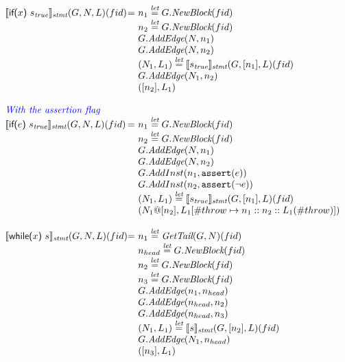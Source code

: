\[
\begin{array}{l@{}l@{~}l}

\transfun{\ircfgif{x}{s_{\emph{true}}}{}}_{\emph{stmt}}(G,N,L)(fid) & = &
	n_1 \letval G.\emph{NewBlock}(fid)\\
	& & n_2 \letval G.\emph{NewBlock}(fid)\\
	& & G.\emph{AddEdge}(N,n_1)\\
	& & G.\emph{AddEdge}(N,n_2)\\
	& & (N_1,L_1) \letval \transfun{s_{\emph{true}}}_{\emph{stmt}}(G,[n_1],L)(fid)\\
	& & G.\emph{AddEdge}(N_1,n_2)\\
	& & ([n_2],L_1)\\
	& & \\
	
{\inblue \textit{With the assertion flag}} \\
\transfun{\ircfgif{e}{s_{\emph{true}}}{}}_{\emph{stmt}}(G,N,L)(fid) & = &
	n_1 \letval G.\emph{NewBlock}(fid)\\
	& & n_2 \letval G.\emph{NewBlock}(fid)\\
	& & G.\emph{AddEdge}(N,n_1)\\
	& & G.\emph{AddEdge}(N,n_2)\\
	& & G.AddInst(n_1, \TT{assert}(e))\\
	& & G.AddInst(n_2, \TT{assert}(\neg e))\\
	& & (N_1,L_1) \letval \transfun{s_{\emph{true}}}_{\emph{stmt}}(G,[n_1],L)(fid)\\
	& & (N_1@[n_2],L_1[\#throw \mapsto n_1::n_2::L_1(\#throw)])\\
	& & \\

\transfun{\ircfgwhile{x}{s}}_{\emph{stmt}}(G,N,L)(fid) & = &
	n_1 \letval \GetTail(G,N)(fid)\\
	& & n_{head} \letval G.\emph{NewBlock}(fid)\\
	& & n_2 \letval G.\emph{NewBlock}(fid)\\
	& & n_3 \letval G.\emph{NewBlock}(fid)\\
	& & G.\emph{AddEdge}(n_1,n_{head})\\
	& & G.\emph{AddEdge}(n_{head},n_2)\\
	& & G.\emph{AddEdge}(n_{head},n_3)\\
	& & (N_1,L_1) \letval \transfun{s}_{\emph{stmt}}(G,[n_2],L)(fid)\\
	& & G.\emph{AddEdge}(N_1,n_{head})\\
	& & ([n_3],L_1) \\
	& & \\


\end{array}\]
